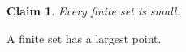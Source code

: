 \documentclass{article}
\newtheorem{claim}{Claim}
\begin{document}
\begin{claim}
Every finite set is small.
\end{claim}
\begin{claimproof}
A finite set has a largest point.
\end{claimproof}
\end{document}
